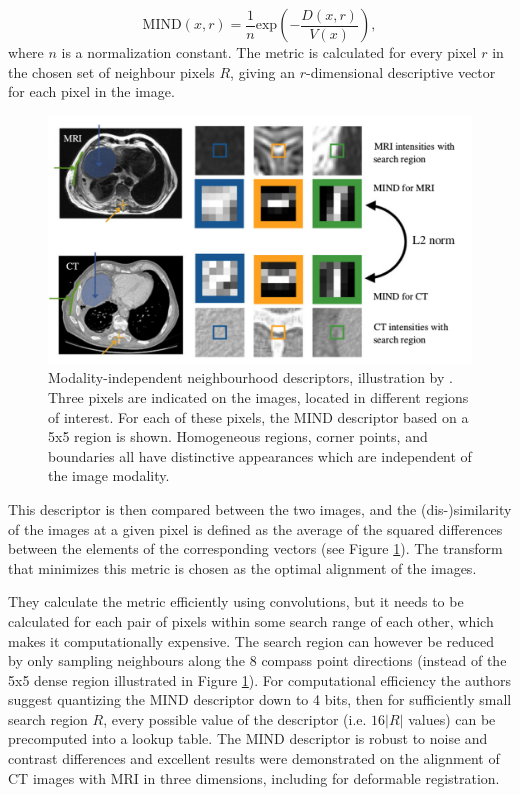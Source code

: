 \documentclass{report}
\begin{document}
\[
\text{MIND}(x,r) = \frac{1}{n}\text{exp}\left( - \frac{D(x, r)}{V(x)} \right),
\]
where $n$ is a normalization constant. The metric is calculated for every pixel $r$ in the chosen set of neighbour pixels $R$, giving an $r$-dimensional descriptive vector for each pixel in the image.
\begin{figure}
\centering
\includegraphics[width=5.5in]{mind_orig.pdf}
\caption{Modality-independent neighbourhood descriptors, illustration by \cite{heinrich2012mind}. Three pixels are indicated on the images, located in different regions of interest. For each of these pixels, the MIND descriptor based on a 5x5 region is shown. Homogeneous regions, corner points, and boundaries all have distinctive appearances which are independent of the image modality.}
\label{fig:MIND}
\end{figure}

This descriptor is then compared between the two images, and the (dis-)similarity of the images at a given pixel is defined as the average of the squared differences between the elements of the corresponding vectors (see Figure \ref{fig:MIND}). The transform that minimizes this metric is chosen as the optimal alignment of the images.

They calculate the metric efficiently using convolutions, but it needs to be calculated for each pair of pixels within some search range of each other, which makes it computationally expensive. The search region can however be reduced by only sampling neighbours along the 8 compass point directions (instead of the 5x5 dense region illustrated in Figure \ref{fig:MIND}). For computational efficiency the authors suggest quantizing the MIND descriptor down to 4 bits, then for sufficiently small search region $R$, every possible value of the descriptor (i.e. $16|R|$ values) can be precomputed into a lookup table. The MIND descriptor is robust to noise and contrast differences and excellent results were demonstrated on the alignment of CT images with MRI in three dimensions, including for deformable registration.
\end{document}
